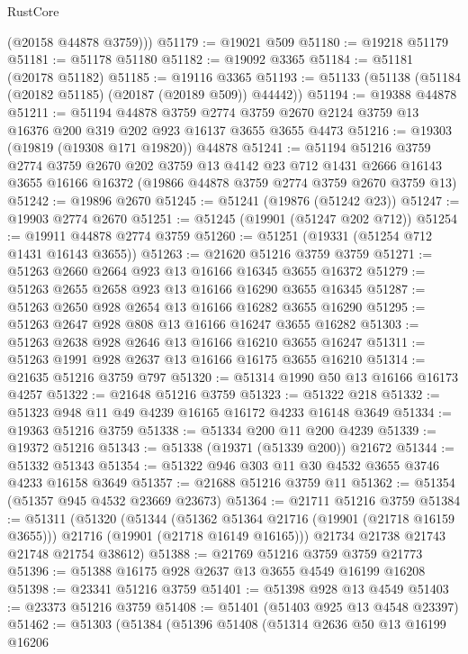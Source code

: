 \begin{lexlean}{RustCore}
\begin{coremodule}
        (@20158 @44878 @3759)))
@51179 := @19021 @509
@51180 := @19218 @51179
@51181 := @51178 @51180
@51182 := @19092 @3365
@51184 := @51181 (@20178 @51182)
@51185 := @19116 @3365
@51193 := @51133 (@51138 (@51184 (@20182 @51185) (@20187 (@20189 @509)) @44442))
@51194 := @19388 @44878
@51211 := @51194
    @44878
    @3759
    @2774
    @3759
    @2670
    @2124
    @3759
    @13
    @16376
    @200
    @319
    @202
    @923
    @16137
    @3655
    @3655
    @4473
@51216 := @19303 (@19819 (@19308 @171 @19820)) @44878
@51241 := @51194
    @51216
    @3759
    @2774
    @3759
    @2670
    @202
    @3759
    @13
    @4142
    @23
    @712
    @1431
    @2666
    @16143
    @3655
    @16166
    @16372
    (@19866 @44878 @3759 @2774 @3759 @2670 @3759 @13)
@51242 := @19896 @2670
@51245 := @51241 (@19876 (@51242 @23))
@51247 := @19903 @2774 @2670
@51251 := @51245 (@19901 (@51247 @202 @712))
@51254 := @19911 @44878 @2774 @3759
@51260 := @51251 (@19331 (@51254 @712 @1431 @16143 @3655))
@51263 := @21620 @51216 @3759 @3759
@51271 := @51263 @2660 @2664 @923 @13 @16166 @16345 @3655 @16372
@51279 := @51263 @2655 @2658 @923 @13 @16166 @16290 @3655 @16345
@51287 := @51263 @2650 @928 @2654 @13 @16166 @16282 @3655 @16290
@51295 := @51263 @2647 @928 @808 @13 @16166 @16247 @3655 @16282
@51303 := @51263 @2638 @928 @2646 @13 @16166 @16210 @3655 @16247
@51311 := @51263 @1991 @928 @2637 @13 @16166 @16175 @3655 @16210
@51314 := @21635 @51216 @3759 @797
@51320 := @51314 @1990 @50 @13 @16166 @16173 @4257
@51322 := @21648 @51216 @3759
@51323 := @51322 @218
@51332 := @51323 @948 @11 @49 @4239 @16165 @16172 @4233 @16148 @3649
@51334 := @19363 @51216 @3759
@51338 := @51334 @200 @11 @200 @4239
@51339 := @19372 @51216
@51343 := @51338 (@19371 (@51339 @200)) @21672
@51344 := @51332 @51343
@51354 := @51322 @946 @303 @11 @30 @4532 @3655 @3746 @4233 @16158 @3649
@51357 := @21688 @51216 @3759 @11
@51362 := @51354 (@51357 @945 @4532 @23669 @23673)
@51364 := @21711 @51216 @3759
@51384 := @51311
    (@51320
      (@51344
        (@51362 @51364 @21716 (@19901 (@21718 @16159 @3655)))
        @21716
        (@19901 (@21718 @16149 @16165)))
      @21734
      @21738
      @21743
      @21748
      @21754
      @38612)
@51388 := @21769 @51216 @3759 @3759 @21773
@51396 := @51388 @16175 @928 @2637 @13 @3655 @4549 @16199 @16208
@51398 := @23341 @51216 @3759
@51401 := @51398 @928 @13 @4549
@51403 := @23373 @51216 @3759
@51408 := @51401 (@51403 @925 @13 @4548 @23397)
@51462 := @51303
    (@51384
      (@51396
        @51408
        (@51314
          @2636
          @50
          @13
          @16199
          @16206

\end{coremodule}
\end{lexlean}
